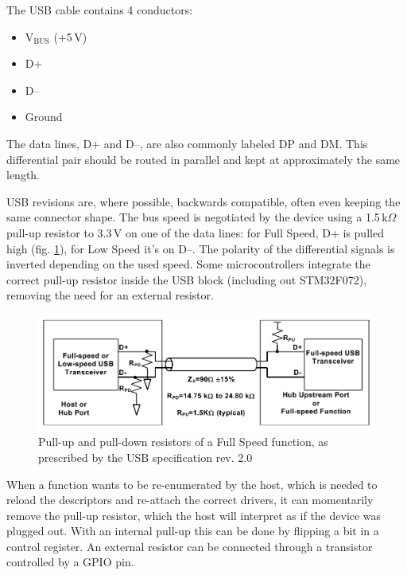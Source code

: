 The USB cable contains 4 conductors:

\begin{itemize}\setlength\itemsep{.2em}
	\item V$_\mathrm{BUS}$ (+5\,V)
	\item D+
	\item D--
	\item Ground
\end{itemize}

The data lines, D+ and D--, are also commonly labeled DP and DM. This differential pair should be routed in parallel and kept at approximately the same length.

USB revisions are, where possible, backwards compatible, often even keeping the same connector shape. The bus speed is negotiated by the device using a 1.5\,k$\Omega$ pull-up resistor to 3.3\,V on one of the data lines: for Full Speed, D+ is pulled high (fig. \ref{fig:usb-pullup-fs}), for Low Speed it's on D--. The polarity of the differential signals is inverted depending on the used speed. Some microcontrollers integrate the correct pull-up resistor inside the USB block (including out STM32F072), removing the need for an external resistor.

\begin{figure}
	\centering
	\includegraphics[width=.8\textwidth]{img/usb-pullup-fs.png}
	\caption[USB pull-ups]{\label{fig:usb-pullup-fs}Pull-up and pull-down resistors of a Full Speed function, as prescribed by the USB specification rev. 2.0}
\end{figure}

When a function wants to be re-enumerated by the host, which is needed to reload the descriptors and re-attach the correct drivers, it can momentarily remove the pull-up resistor, which the host will interpret as if the device was plugged out. With an internal pull-up this can be done by flipping a bit in a control register. An external resistor can be connected through a transistor controlled by a GPIO pin. 



